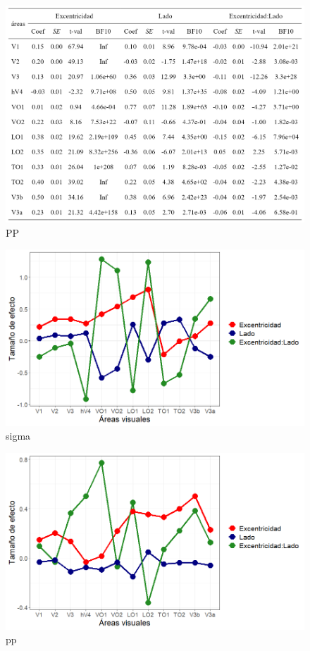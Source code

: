\begin{figure}
	\centering		
	\includegraphics[scale=0.8]{images/table5}
	\caption{PP}
\end{figure}

\begin{figure}
	\centering		
	\includegraphics[scale=0.6]{../images/effect_size_eccen_all_rois}
	\caption{sigma}
\end{figure}
\begin{figure}
	\centering		
	\includegraphics[scale=0.6]{images/effect_size_rois_2}
	\caption{pp}
\end{figure}




